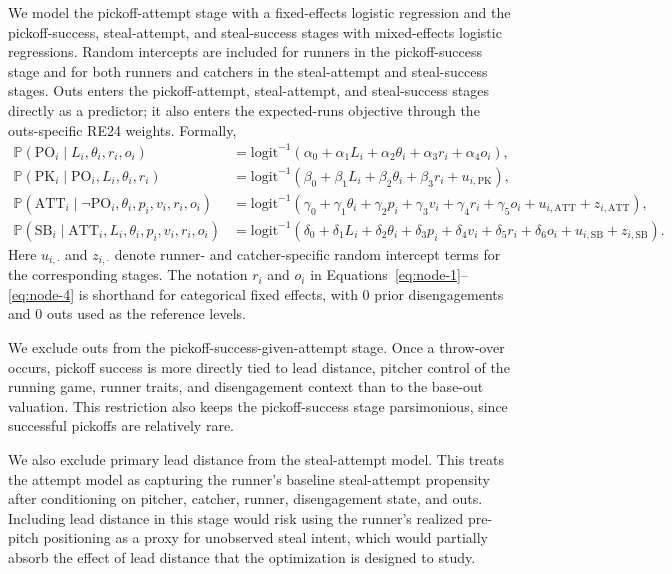 \documentclass[12pt,letterpaper]{article}
\renewcommand{\P}{\mathbb{P}}
\begin{document}
We model the pickoff-attempt stage with a fixed-effects logistic regression and the pickoff-success, steal-attempt, and steal-success stages with mixed-effects logistic regressions. Random intercepts are included for runners in the pickoff-success stage and for both runners and catchers in the steal-attempt and steal-success stages. Outs enters the pickoff-attempt, steal-attempt, and steal-success stages directly as a predictor; it also enters the expected-runs objective through the outs-specific RE24 weights. Formally,
\begin{align}
    \P(\mathrm{PO}_i \mid L_i, \theta_i, r_i, o_i)
    &= \mathrm{logit}^{-1}(\alpha_0 + \alpha_1 L_i + \alpha_2 \theta_i + \alpha_3 r_i + \alpha_4 o_i), \label{eq:node-1} \\
    \P(\mathrm{PK}_i \mid \mathrm{PO}_i, L_i, \theta_i, r_i)
    &= \mathrm{logit}^{-1}(\beta_0 + \beta_1 L_i + \beta_2 \theta_i + \beta_3 r_i + u_{i,\mathrm{PK}}), \label{eq:node-2} \\
    \P(\mathrm{ATT}_i \mid \neg\mathrm{PO}_i, \theta_i, p_i, v_i, r_i, o_i)
    &= \mathrm{logit}^{-1}(\gamma_0 + \gamma_1 \theta_i + \gamma_2 p_i + \gamma_3 v_i + \gamma_4 r_i + \gamma_5 o_i 
    + u_{i,\mathrm{ATT}} + z_{i,\mathrm{ATT}}), \label{eq:node-3} \\
    \P(\mathrm{SB}_i \mid \mathrm{ATT}_i, L_i, \theta_i, p_i, v_i, r_i, o_i)
    &= \mathrm{logit}^{-1}(\delta_0 + \delta_1 L_i + \delta_2 \theta_i + \delta_3 p_i + \delta_4 v_i 
    + \delta_5 r_i + \delta_6 o_i + u_{i,\mathrm{SB}} + z_{i,\mathrm{SB}}). \label{eq:node-4}
\end{align}
Here $u_{i,\cdot}$ and $z_{i,\cdot}$ denote runner- and catcher-specific random intercept terms for the corresponding stages. The notation $r_i$ and $o_i$ in Equations~\ref{eq:node-1}--\ref{eq:node-4} is shorthand for categorical fixed effects, with 0 prior disengagements and 0 outs used as the reference levels.

We exclude outs from the pickoff-success-given-attempt stage. Once a throw-over occurs, pickoff success is more directly tied to lead distance, pitcher control of the running game, runner traits, and disengagement context than to the base-out valuation. This restriction also keeps the pickoff-success stage parsimonious, since successful pickoffs are relatively rare.

We also exclude primary lead distance from the steal-attempt model. This treats the attempt model as capturing the runner's baseline steal-attempt propensity after conditioning on pitcher, catcher, runner, disengagement state, and outs. Including lead distance in this stage would risk using the runner's realized pre-pitch positioning as a proxy for unobserved steal intent, which would partially absorb the effect of lead distance that the optimization is designed to study.
\end{document}
